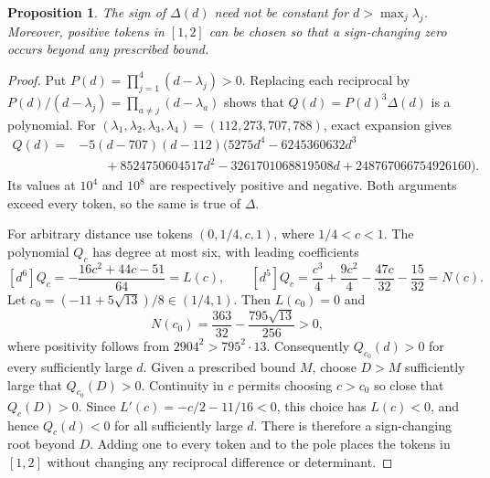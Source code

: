 \documentclass[11pt]{article}
\newtheorem{proposition}{Proposition}
\begin{document}
\begin{proposition}
The sign of $\Delta(d)$ need not be constant for
$d>\max_j\lambda_j$. Moreover, positive tokens in $[1,2]$ can be
chosen so that a sign-changing zero occurs beyond any prescribed bound.
\end{proposition}
\begin{proof}
Put $P(d)=\prod_{j=1}^4(d-\lambda_j)>0$.
Replacing each reciprocal by
$P(d)/(d-\lambda_j)=\prod_{a\neq j}(d-\lambda_a)$ shows that
$Q(d)=P(d)^3\Delta(d)$ is a polynomial. For
$(\lambda_1,\lambda_2,\lambda_3,\lambda_4)=(112,273,707,788)$,
exact expansion gives
\[
\begin{split}
Q(d)={}&-5(d-707)(d-112)\bigl(5275d^4-6245360632d^3\\
 &\qquad+8524750604517d^2-3261701068819508d
                       +248767066754926160\bigr).
\end{split}
\]
Its values at $10^4$ and $10^8$ are respectively positive and negative.
Both arguments exceed every token, so the same is true of $\Delta$.

For arbitrary distance use tokens $(0,1/4,c,1)$, where $1/4<c<1$.
The polynomial $Q_c$ has degree at most six, with leading coefficients
\[
 [d^6]Q_c=-\frac{16c^2+44c-51}{64}=L(c),\qquad
 [d^5]Q_c=\frac{c^3}{4}+\frac{9c^2}{4}
                       -\frac{47c}{32}-\frac{15}{32}=N(c).
\]
Let $c_0=(-11+5\sqrt{13})/8\in(1/4,1)$.
Then $L(c_0)=0$ and
\[
 N(c_0)=\frac{363}{32}-\frac{795\sqrt{13}}{256}>0,
\]
where positivity follows from $2904^2>795^2\cdot13$.
Consequently $Q_{c_0}(d)>0$ for every sufficiently large $d$.
Given a prescribed bound $M$, choose $D>M$ sufficiently large that
$Q_{c_0}(D)>0$. Continuity in $c$ permits choosing $c>c_0$ so close
that $Q_c(D)>0$. Since $L'(c)=-c/2-11/16<0$, this choice has
$L(c)<0$, and hence $Q_c(d)<0$ for all sufficiently large $d$.
There is therefore a sign-changing root beyond $D$.
Adding one to every token and to the pole places the tokens in
$[1,2]$ without changing any reciprocal difference or determinant.
\end{proof}
\end{document}
